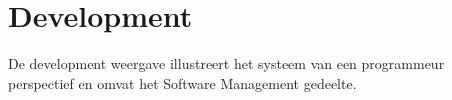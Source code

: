 \section{Development}

De development weergave illustreert het systeem van een programmeur perspectief en omvat het Software Management gedeelte.